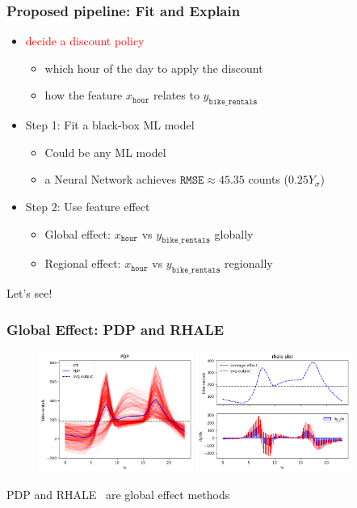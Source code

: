 \documentclass{beamer}
\newcommand{\red}[1]{\textcolor{red}{#1}}
\begin{document}
\begin{frame}
  \frametitle{Proposed pipeline: Fit and Explain}
  \begin{itemize}
  \item \red{decide a discount policy}
    \begin{itemize}
    \item which hour of the day to apply the discount
    \item how the feature $x_{\mathtt{hour}}$ relates to $y_{\mathtt{bike\_rentals}}$
    \end{itemize}

  \item Step 1: Fit a black-box ML model
    \begin{itemize}
    \item Could be any ML model
    \item a Neural Network achieves $\texttt{RMSE} \approx 45.35 $ counts ($0.25Y_\sigma$)
    \end{itemize}
  \item Step 2: Use feature effect
    \begin{itemize}
    \item Global effect: $x_{\mathtt{hour}}$ vs $y_{\mathtt{bike\_rentals}}$ globally
    \item Regional effect: $x_{\mathtt{hour}}$ vs $y_{\mathtt{bike\_rentals}}$ regionally
    \end{itemize}
  \end{itemize}

  \noindent\makebox[\linewidth]{\rule{\paperwidth}{0.4pt}}
  Let's see!
\end{frame}

\begin{frame}
  \frametitle{Global Effect: PDP and RHALE}
  \begin{figure}[ht]
    \centering
    \includegraphics[width=0.45\textwidth]{./figures/bike_sharing_global_pdp_heterogeneity.png}
    \includegraphics[width=0.45\textwidth]{./figures/bike_sharing_global_rhale_heterogeneity.png}
  \end{figure}
  \noindent\makebox[\linewidth]{\rule{\paperwidth}{0.4pt}}
  PDP and RHALE~\citep{gkolemis2023rhale} are global effect methods
\end{frame}
\end{document}
